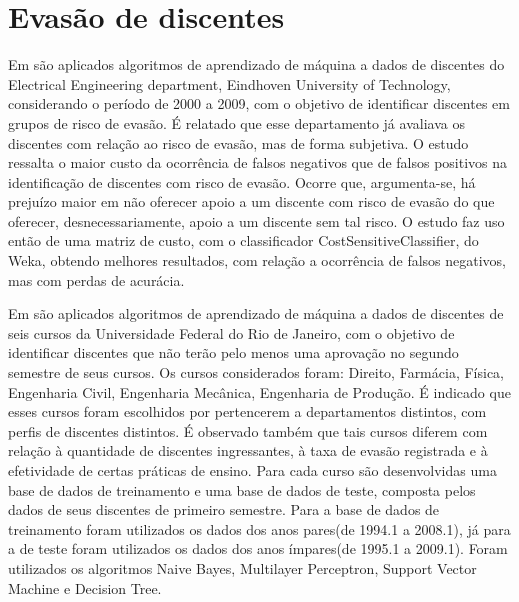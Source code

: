 \chapter{Evasão de discentes}



Em \cite{Predicting_Students} são aplicados algoritmos de aprendizado de máquina a dados de discentes do Electrical Engineering department, Eindhoven University of Technology, considerando o período de 2000 a 2009, com o objetivo de identificar discentes em grupos de risco de evasão. É relatado que esse departamento já avaliava os discentes com relação ao risco de evasão, mas de forma subjetiva. O estudo ressalta o maior custo da ocorrência de falsos negativos que de falsos positivos na identificação de discentes com risco de evasão. Ocorre que, argumenta-se, há prejuízo maior em não oferecer apoio a um discente com risco de evasão do que oferecer, desnecessariamente, apoio a um discente sem tal risco. O estudo faz uso então de uma matriz de custo, com o classificador CostSensitiveClassifier, do Weka, obtendo melhores resultados, com relação a ocorrência de falsos negativos, mas com perdas de acurácia. 


Em \cite{EDM_ufrj} são aplicados algoritmos de aprendizado de máquina a dados de discentes de seis cursos da Universidade Federal do Rio de Janeiro, com o objetivo de identificar discentes que não terão pelo menos uma aprovação no segundo semestre de seus cursos. Os cursos considerados foram: Direito, Farmácia, Física, Engenharia Civil, Engenharia Mecânica, Engenharia de Produção. É indicado que esses cursos foram escolhidos por pertencerem a departamentos distintos, com perfis de discentes distintos. É observado também que tais cursos diferem com relação à quantidade de discentes ingressantes, à taxa de evasão registrada e à efetividade de certas práticas de ensino. Para cada curso são desenvolvidas uma base de dados de treinamento e uma base de dados de teste, composta pelos dados de seus discentes de primeiro semestre. Para a base de dados de treinamento foram utilizados os dados dos anos pares(de 1994.1 a 2008.1), já para a de teste foram utilizados os dados dos anos ímpares(de 1995.1 a 2009.1). Foram utilizados os algoritmos Naive Bayes, Multilayer Perceptron, Support Vector Machine e Decision Tree.

